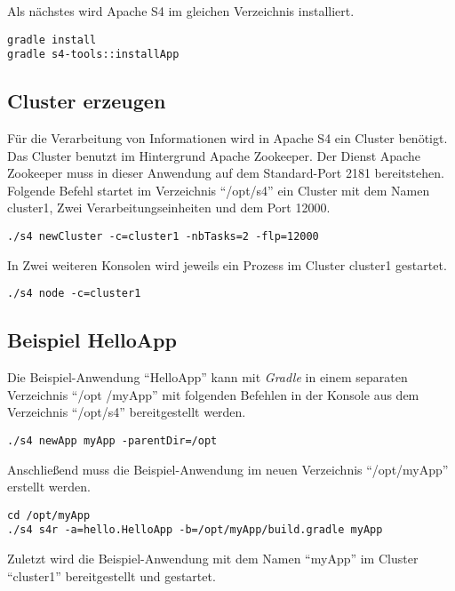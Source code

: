 Als nächstes wird Apache S4 im gleichen Verzeichnis installiert.

\begin{verbatim}
gradle install
gradle s4-tools::installApp
\end{verbatim}


\subsection{Cluster erzeugen}

Für die Verarbeitung von Informationen wird in Apache S4 ein Cluster benötigt. Das Cluster benutzt im Hintergrund Apache Zookeeper. Der Dienst Apache Zookeeper muss in dieser Anwendung auf dem Standard-Port 2181 bereitstehen. Folgende Befehl startet im Verzeichnis "`/opt/s4"' ein Cluster mit dem Namen cluster1, Zwei Verarbeitungseinheiten und dem Port 12000.

\begin{verbatim}
./s4 newCluster -c=cluster1 -nbTasks=2 -flp=12000
\end{verbatim}

In Zwei weiteren Konsolen wird jeweils ein Prozess im Cluster cluster1 gestartet.

\begin{verbatim}
./s4 node -c=cluster1
\end{verbatim}



\subsection{Beispiel HelloApp}
\label{s4:beispielHelloApp}

Die Beispiel-Anwendung "`HelloApp"' kann mit \textit{Gradle} in einem separaten Verzeichnis "`/opt /myApp"' mit folgenden Befehlen in der Konsole aus dem Verzeichnis "`/opt/s4"' bereitgestellt werden. 

\begin{verbatim}
./s4 newApp myApp -parentDir=/opt
\end{verbatim}

Anschließend muss die Beispiel-Anwendung im neuen Verzeichnis "`/opt/myApp"' erstellt werden.

\begin{verbatim}
cd /opt/myApp
./s4 s4r -a=hello.HelloApp -b=/opt/myApp/build.gradle myApp
\end{verbatim}

Zuletzt wird die Beispiel-Anwendung mit dem Namen "`myApp"' im Cluster "`cluster1"' bereitgestellt und gestartet.

